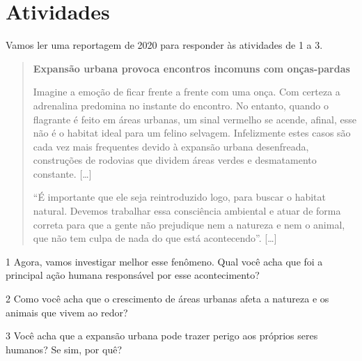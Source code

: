 \section{Atividades}

Vamos ler uma reportagem de 2020 para responder às atividades de 1 a 3.

\begin{quote}
\textbf{Expansão urbana provoca encontros incomuns com onças-pardas}

Imagine a emoção de ficar frente a frente com uma onça. Com certeza a
adrenalina predomina no instante do encontro. No entanto, quando o
flagrante é feito em áreas urbanas, um sinal vermelho se acende, afinal,
esse não é o habitat ideal para um felino selvagem. Infelizmente estes
casos são cada vez mais frequentes devido à expansão urbana desenfreada,
construções de rodovias que dividem áreas verdes e desmatamento
constante. {[}\ldots{}{]}

“É importante que ele seja reintroduzido logo, para buscar o habitat
natural. Devemos trabalhar essa consciência ambiental e atuar de forma
correta para que a gente não prejudique nem a natureza e nem o animal,
que não tem culpa de nada do que está acontecendo”. {[}\ldots{}{]}

\end{quote}

\num{1} Agora, vamos investigar melhor esse fenômeno. Qual você acha que foi a principal ação humana responsável por esse acontecimento?


\num{2} Como você acha que o crescimento de áreas urbanas afeta a natureza e os
animais que vivem ao redor?


\num{3} Você acha que a expansão urbana pode trazer perigo aos próprios seres
humanos? Se sim, por quê?

